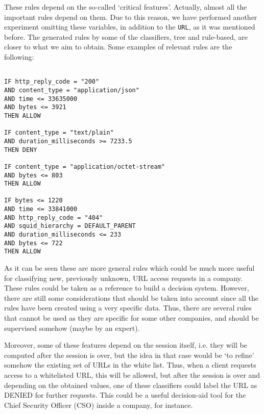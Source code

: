 \documentclass{llncs}
\begin{document}
These rules depend on the so-called `critical features'. Actually, almost all the important rules depend on them. Due to this reason, we have performed another experiment omitting these variables, in addition to the \texttt{URL}, as it was mentioned before. The generated rules by some of the classifiers, tree and rule-based, are closer to what we aim to obtain. Some examples of relevant rules are the following:

\begin{small}
\begin{verbatim}

IF http_reply_code = "200"
AND content_type = "application/json"
AND time <= 33635000
AND bytes <= 3921
THEN ALLOW

IF content_type = "text/plain"
AND duration_milliseconds >= 7233.5
THEN DENY

IF content_type = "application/octet-stream"
AND bytes <= 803
THEN ALLOW

IF bytes <= 1220
AND time <= 33841000
AND http_reply_code = "404"
AND squid_hierarchy = DEFAULT_PARENT
AND duration_milliseconds <= 233
AND bytes <= 722
THEN ALLOW
\end{verbatim}
\end{small}

As it can be seen these are more general rules which could be much more useful for classifying new, previously unknown, URL access requests in a company. These rules could be taken as a reference to build a decision system. However, there are still some considerations that should be taken into account since all the rules have been created using a very specific data. Thus, there are several rules that cannot be used as they are specific for some other companies, and should be supervised somehow (maybe by an expert).

Moreover, some of these features depend on the session itself, i.e. they will be computed after the session is over, but the idea in that case would be `to refine' somehow the existing set of URLs in the white list. Thus, when a client requests access to a whitelisted URL, this will be allowed, but after the session is over and depending on the obtained values, one of these classifiers could label the URL as DENIED for further requests. This could be a useful decision-aid tool for the Chief Security Officer (CSO) inside a company, for instance.

%
\end{document}
